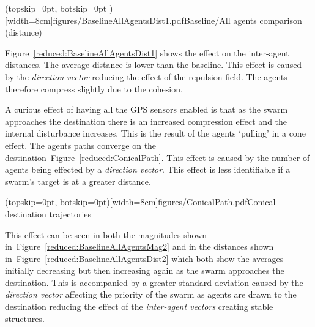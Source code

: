 \documentclass{ieeeaccess}
\begin{document}
\Figure[t!](topskip=0pt, botskip=0pt )[width=8cm]{figures/BaselineAllAgentsDist1.pdf}{Baseline/All agents comparison (distance)\label{reduced:BaselineAllAgentsDist1}}

Figure~\ref{reduced:BaselineAllAgentsDist1} shows the effect on the inter-agent distances. The average distance is lower than the baseline. This effect is caused by the \textit{direction vector} reducing the effect of the repulsion field. The agents therefore compress slightly due to the cohesion.

A curious effect of having all the GPS sensors enabled is that as the swarm approaches the destination there is an increased compression effect and the internal disturbance increases. This is the result of the agents `pulling' in a cone effect. The agents paths converge on the destination~Figure~\ref{reduced:ConicalPath}. This effect is caused by the number of agents being effected by a \textit{direction vector}. This effect is less identifiable if a swarm's target is at a greater distance.  


\Figure[t!](topskip=0pt, botskip=0pt)[width=8cm]{figures/ConicalPath.pdf}{Conical destination trajectories\label{reduced:ConicalPath}}

This effect can be seen in both the magnitudes shown in~Figure~\ref{reduced:BaselineAllAgentsMag2} and in the distances shown in~Figure~\ref{reduced:BaselineAllAgentsDist2} which both show the averages initially decreasing but then increasing again as the swarm approaches the destination. This is accompanied by a greater standard deviation caused by the \textit{direction vector} affecting the priority of the swarm as agents are drawn to the destination reducing the effect of the \textit{inter-agent vectors} creating stable structures.
\end{document}
